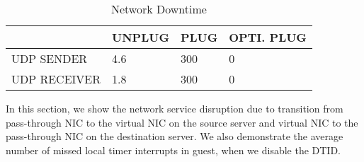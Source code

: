 

\begin{table}[tbp]
\begin{tabular}{|l|l|l|l|}
\hline
& UNPLUG & PLUG & OPTI. PLUG \\ \hline
UDP SENDER & 4.6 & 300 & 0 \\ \hline
UDP RECEIVER & 1.8 & 300 & 0 \\ \hline
\end{tabular}
\caption{Network Downtime}
\label{tab:migration_network_downtime}
\end{table}

In this section, we show the network service disruption
due to transition from pass-through NIC to the virtual NIC 
on the source server and virtual NIC to the pass-through
NIC on the destination server.
We also demonstrate the average 
number of missed local timer interrupts in guest, 
when we disable the DTID.

